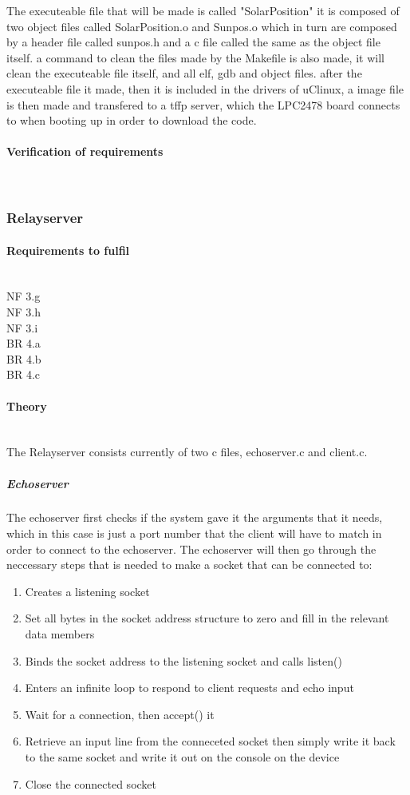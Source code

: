 The executeable file that will be made is called "SolarPosition" it is composed of two object files called SolarPosition.o and Sunpos.o which in turn are composed by a header file called sunpos.h and a c file called the same as the object file itself.
a command to clean the files made by the Makefile is also made, it will clean the executeable file itself, and all elf, gdb and object files. 
after the executeable file it made, then it is included in the drivers of uClinux, a image file is then made and transfered to a tffp server, which the LPC2478 board connects to when booting up in order to download the code.

\paragraph{Verification of requirements}\mbox{}\\

\subsubsection{Relayserver}
\paragraph{Requirements to fulfil}\mbox{}\\
NF 3.g\\
NF 3.h\\
NF 3.i\\
BR 4.a\\
BR 4.b\\
BR 4.c\\

\paragraph{Theory}\mbox{}\\
The Relayserver consists currently of two c files, echoserver.c and client.c.
\subparagraph{Echoserver}
The echoserver first checks if the system gave it the arguments that it needs, which in this case is just a port number that the client will have to match in order to connect to the echoserver. 
The echoserver will then go through the neccessary steps that is needed to make a socket that can be connected to:
\begin{enumerate}
\item Creates a listening socket
\item Set all bytes in the socket address structure to zero and fill in the relevant data members
\item Binds the socket address to the listening socket and calls listen()
\item Enters an infinite loop to respond to client requests and echo input
\item Wait for a connection, then accept() it
\item Retrieve an input line from the conneceted socket then simply write it back to the same socket and write it out on the console on the device
\item Close the connected socket
\end{enumerate}

